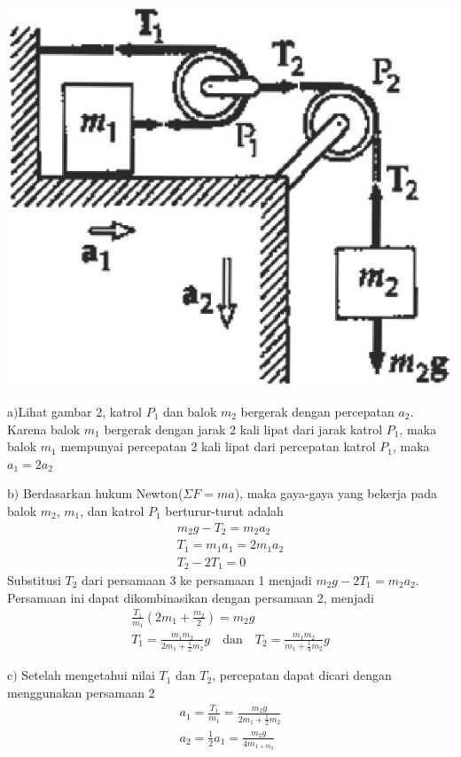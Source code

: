 \begin{solution}
\begin{center}
		\includegraphics[scale=0.4]{./latex/eps/1_5_1_image_2.eps}
\end{center}

a$)$Lihat gambar 2, katrol $P_{1}$ dan balok $m_{2}$ bergerak dengan percepatan $a_{2}$.
Karena balok $m_{1}$ bergerak dengan jarak 2 kali lipat dari jarak katrol $P_{1}$, maka balok $m_{1}$ mempunyai percepatan 2 kali lipat dari percepatan katrol $P_{1}$, maka $a_{1}=2 a_{2}$

b$)$ Berdasarkan hukum Newton($\Sigma F=ma$), maka gaya-gaya yang bekerja pada balok $m_{2}$, $m_{1}$, dan katrol $P_{1}$ berturur-turut adalah
\begin{eqnarray}
	m_{2}g-T_{2}=m_{2}a_{2} \\
	T_{1}=m_{1}a_{1}=2 m_{1}a_{2}\\
	T_{2}-2T_{1}=0
\end{eqnarray}
Substitusi $T_{2}$ dari persamaan 3 ke persamaan 1 menjadi $m_{2}g-2T_{1}=m_{2}a_{2} $. Persamaan ini dapat dikombinasikan dengan persamaan 2, menjadi
\begin{eqnarray*}
\frac{T_{1}}{m_{1}}\left( 2m_{1}+\frac{m_{2}}{2} \right)=m_{2}g \\
T_{1}=\frac{m_{1}m_{2}}{2 m_{1}+\frac{1}{2}m_{2}}g \quad \mbox{dan} \quad T_{2}=\frac{m_{1}m_{2}}{ m_{1}+\frac{1}{4}m_{2}}g
\end{eqnarray*}

c$)$ Setelah mengetahui nilai $T_{1}$ dan $T_{2}$, percepatan dapat dicari dengan menggunakan persamaan 2 
\begin{eqnarray*}
a_{1}=\frac{T_{1}}{m_{1}}=\frac{m_{2} g}{2 m_{1}+\frac{1}{2} m_{2}} \\
a_{2}=\frac{1}{2}a_{1}=\frac{m_{2}g}{4 m_{1+m_{2}}}
\end{eqnarray*}
\end{solution}
